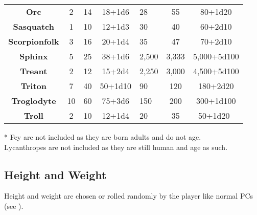 \begin{multicols*}{2}
\begin {table}[H]
\begin{tabularx}{\columnwidth}{>{\bfseries}ccccYcc}
	Orc & 2 & 14 & 18+1d6 & 28 & 55 & 80+1d20\\
	Sasquatch & 1 & 10 & 12+1d3 & 30 & 40 & 60+2d10\\
	Scorpionfolk & 3 & 16 & 20+1d4 & 35 & 47 & 70+2d10\\
	Sphinx & 5 & 25 & 38+1d6 & 2,500 & 3,333 & 5,000+5d100\\
	Treant & 2 & 12 & 15+2d4 & 2,250 & 3,000 & 4,500+5d100\\
	Triton & 7 & 40 & 50+1d10 & 90 & 120 & 180+2d20\\
	Troglodyte & 10 & 60 & 75+3d6 & 150 & 200 & 300+1d100\\
	Troll & 2 & 10 & 12+1d4 & 20 & 35 & 50+1d20\
  \end {tabularx}
	* Fey are not included as they are born adults and do not age.\\
	Lycanthropes are not included as they are still human and age as such.
\end {table}

\subsection{Height and Weight}
Height and weight are chosen or rolled randomly by the player like normal PCs (see ).


\end{multicols*}
